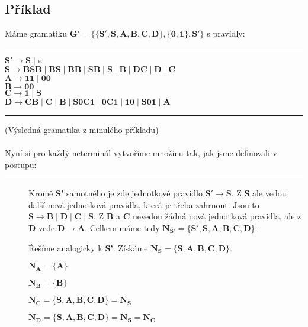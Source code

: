 \documentclass{report}
\begin{document}
\subsection*{Příklad}
 Máme gramatiku $\mathbf{G' = \{\{S',S,A,B,C,D\},\{0,1\},S'\}}$ s pravidly:
\vspace{0.4cm}
\hrule
\vspace{0.1cm}
\begin{description}
    \item[$\mathbf{S' \rightarrow S \mid \varepsilon}$]
    \item[$\mathbf{S \rightarrow BSB \mid BS \mid BB \mid SB \mid S \mid B \mid DC \mid D \mid C}$]
    \item[$\mathbf{A \rightarrow 11 \mid 00}$]
    \item[$\mathbf{B \rightarrow 00 }$]
    \item[$\mathbf{C \rightarrow 1 \mid S}$]
    \item[$\mathbf{D \rightarrow CB \mid C \mid B \mid S0C1 \mid 0C1 \mid 10 \mid S01 \mid A}$]
\end{description}
\vspace{0.1cm}    
\hrule
\vspace{0.4cm}
(Výsledná gramatika z minulého příkladu)\\ \\
Nyní si pro každý neterminál vytvoříme množinu tak, jak jsme definovali v postupu:
\vspace{0.4cm}    
\hrule
\vspace{0.1cm}
\begin{description}
    \item[] Kromě \textbf{S'} samotného je zde jednotkové pravidlo $\mathbf{S' \rightarrow S}$. Z \textbf{S} ale vedou další nová jednotková pravidla, která je třeba zahrnout. Jsou to $\mathbf{S \rightarrow B \mid D \mid C \mid S}$. Z \textbf{B} a \textbf{C} nevedou žádná nová jednotková pravidla, ale z \textbf{D} vede $\mathbf{D \rightarrow A}$. Celkem máme tedy $\mathbf{N_{S'}=\{S',S,A,B,C,D\}}$.
    \item[] Řešíme analogicky k \textbf{S'}. Získáme $\mathbf{N_{S}=\{S,A,B,C,D\}}$.
    \item[] $\mathbf{N_{A}=\{A\}}$
    \item[] $\mathbf{N_{B}=\{B\}}$
    \item[] $\mathbf{N_{C}=\{S,A,B,C,D\} = N_{S}}$
    \item[] $\mathbf{N_{D}=\{S,A,B,C,D\} = N_{S} = N_{C}}$
\end{description}
\end{document}
